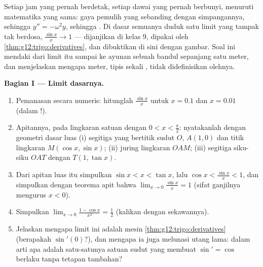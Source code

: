 \begin{problem}
\label{pb:g12:trigo:1}
Setiap jam yang pernah berdetak, setiap dawai yang pernah berbunyi,
menuruti matematika yang sama: gaya pemulih yang sebanding dengan
simpangannya, sehingga  $y'' = -\omega^2 y$, sehingga
. Di dasar semuanya duduk satu limit yang tampak tak berdosa,
$\frac{\sin x}{x} \to 1$ --- dijanjikan di kelas 9, dipakai oleh
\cref{thm:g12:trigo:derivatives}, dan dibuktikan di sini dengan gambar.
Soal ini mendaki dari limit itu sampai ke ayunan sebuah bandul
sepanjang satu meter, dan menjelaskan mengapa meter, tipis sekali
, tidak didefinisikan olehnya.

\medskip
\noindent\textbf{Bagian I --- Limit dasarnya.}
\begin{enumerate}
  \item Pemanasan secara numeris: hitunglah $\frac{\sin x}{x}$ untuk
        $x = 0.1$ dan $x = 0.01$ (dalam !).
  \item Apitannya, pada lingkaran satuan dengan
        $0 < x < \frac\pi2$: nyatakanlah dengan geometri dasar
        luas (i) segitiga yang bertitik sudut $O$, $A(1,0)$
        dan titik lingkaran $M(\cos x, \sin x)$; (ii) juring
        lingkaran $OAM$; (iii) segitiga siku-siku $OAT$
        dengan $T(1, \tan x)$.
  \item Dari apitan luas itu simpulkan
        $\sin x < x < \tan x$, lalu
        $\cos x < \frac{\sin x}{x} < 1$, dan simpulkan dengan
        teorema apit bahwa
        $\lim_{x \to 0} \frac{\sin x}{x} = 1$ (sifat ganjilnya mengurus
        $x < 0$).
  \item Simpulkan
        $\lim_{x \to 0} \frac{1 - \cos x}{x^2} = \frac12$
        (kalikan dengan sekawannya).
  \item Jelaskan mengapa limit ini adalah mesin
        \cref{thm:g12:trigo:derivatives} (berapakah
        $\sin'(0)$?), dan mengapa ia juga melunasi utang lama: dalam
        arti apa \emph{} adalah satu-satunya satuan sudut yang
        membuat $\sin' = \cos$ berlaku tanpa tetapan tambahan?
\end{enumerate}


\end{problem}
